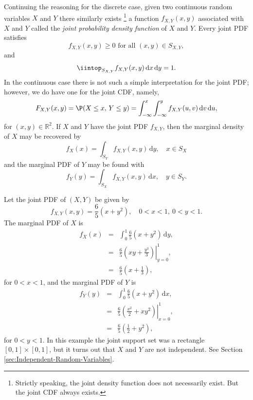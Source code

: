 \documentclass[captions=tableheading]{scrbook}
\begin{document}
Continuing the reasoning for the discrete case, given two continuous random variables \(X\) and \(Y\) there similarly exists
\footnote{Strictly speaking, the joint density function does not necessarily exist. But the joint CDF always exists.}
a function \(f_{X,Y}(x,y)\) associated with \(X\) and \(Y\) called the \emph{joint probability density function} of \(X\) and \(Y\). Every joint PDF satisfies
\begin{equation}
f_{X,Y}(x,y)\geq0\mbox{ for all }(x,y)\in S_{X,Y},
\end{equation}
and
\begin{equation}
\iintop_{S_{X,Y}}f_{X,Y}(x,y)\,\mathrm{d} x\,\mathrm{d} y=1.
\end{equation}
In the continuous case there is not such a simple interpretation for the joint PDF; however, we do have one for the joint CDF, namely,
\[
F_{X,Y}(x,y)=\P(X\leq x,\, Y\leq y)=\int_{-\infty}^{x}\int_{-\infty}^{y}f_{X,Y}(u,v)\,\mathrm{d} v\,\mathrm{d} u,
\]
for \((x,y)\in\mathbb{R}^{2}\). If \(X\) and \(Y\) have the joint PDF \(f_{X,Y}\), then the marginal density of \(X\) may be recovered by
\begin{equation}
f_{X}(x)=\int_{S_{Y}}f_{X,Y}(x,y)\,\mathrm{d} y,\quad x\in S_{X}
\end{equation}
and the marginal PDF of \(Y\) may be found with
\begin{equation}
f_{Y}(y)=\int_{S_{X}}f_{X,Y}(x,y)\,\mathrm{d} x,\quad y\in S_{Y}.
\end{equation}


\begin{example}
\label{exa:joint-pdf}

Let the joint PDF of \((X,Y)\) be given by
\[
f_{X,Y}(x,y)=\frac{6}{5}\left(x+y^{2}\right),\quad0<x<1,\ 0<y<1.
\]
The marginal PDF of \(X\) is
\begin{eqnarray*}
f_{X}(x) & = & \int_{0}^{1}\frac{6}{5}\left(x+y^{2}\right)\,\mathrm{d} y,\\
 & = & \left.\frac{6}{5}\left(xy+\frac{y^{3}}{3}\right)\right|_{y=0}^{1},\\
 & = & \frac{6}{5}\left(x+\frac{1}{3}\right),
\end{eqnarray*}
for \(0<x<1\), and the marginal PDF of \(Y\) is
\begin{eqnarray*}
f_{Y}(y) & = & \int_{0}^{1}\frac{6}{5}\left(x+y^{2}\right)\,\mathrm{d} x,\\
 & = & \left.\frac{6}{5}\left(\frac{x^{2}}{2}+xy^{2}\right)\right|_{x=0}^{1},\\
 & = & \frac{6}{5}\left(\frac{1}{2}+y^{2}\right),
\end{eqnarray*}
for \(0<y<1\). In this example the joint support set was a rectangle \([0,1]\times[0,1]\), but it turns out that \(X\) and \(Y\) are not independent. See Section \ref{sec:Independent-Random-Variables}.
\end{example}
\end{document}
